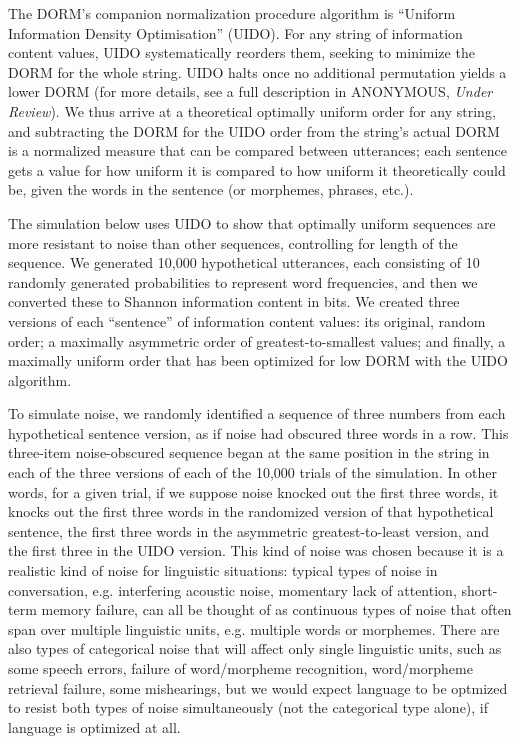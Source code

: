 \documentclass[12pt]{article}
\begin{document}
The DORM's companion normalization procedure algorithm is ``Uniform Information Density Optimisation'' (UIDO). For any string of information content values, UIDO systematically reorders them, seeking to minimize the DORM for the whole string. UIDO halts once no additional permutation yields a lower DORM (for more details, see a full description in ANONYMOUS, \textsl{Under Review}). We thus arrive at a theoretical optimally uniform order for any string, and subtracting the DORM for the UIDO order from the string's actual DORM is a normalized measure that can be compared between utterances; each sentence gets a value for how uniform it is compared to how uniform it theoretically could be, given the words in the sentence (or morphemes, phrases, etc.).

The simulation below uses UIDO to show that optimally uniform sequences are more resistant to noise than other sequences, controlling for length of the sequence. We generated 10,000 hypothetical utterances, each consisting of 10 randomly generated probabilities to represent word frequencies, and then we converted these to Shannon information content in bits. We created three versions of each ``sentence'' of information content values: its original, random order; a maximally asymmetric order of greatest-to-smallest values; and finally, a maximally uniform order that has been optimized for low DORM with the UIDO algorithm.

To simulate noise, we randomly identified a sequence of three numbers from each hypothetical sentence version, as if noise had obscured three words in a row. This three-item noise-obscured sequence began at the same position in the string in each of the three versions of each of the 10,000 trials of the simulation. In other words, for a given trial, if we suppose noise knocked out the first three words, it knocks out the first three words in the randomized version of that hypothetical sentence, the first three words in the asymmetric greatest-to-least version, and the first three in the UIDO version. This kind of noise was chosen because it is a realistic kind of noise for linguistic situations: typical types of noise in conversation, e.g. interfering acoustic noise, momentary lack of attention, short-term memory failure, can all be thought of as continuous types of noise that often span over multiple linguistic units, e.g. multiple words or morphemes. There are also types of categorical noise that will affect only single linguistic units, such as some speech errors, failure of word/morpheme recognition, word/morpheme retrieval failure, some mishearings, but we would expect language to be optmized to resist both types of noise simultaneously (not the categorical type alone), if language is optimized at all.
\end{document}
